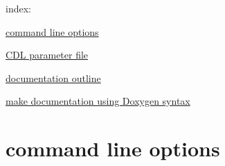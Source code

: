 index: \begin{DoxyItemize}
\item \hyperlink{index_sectionCommandLine}{command line options} \item \hyperlink{index_sectionParameterFile}{CDL parameter file} \item \hyperlink{index_sectionDAQlmlDocumentation}{documentation outline} \item \hyperlink{index_sectionDoxygenSyntax}{make documentation using Doxygen syntax}\end{DoxyItemize}
\hypertarget{index_sectionCommandLine}{}\section{command line options}\label{index_sectionCommandLine}

